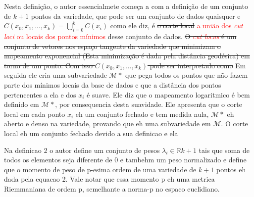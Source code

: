\documentclass[a4paper,titlepage]{article}
\newcommand{\juliana}[1]{\textcolor{red}{#1}}
\begin{document}
\vspace{1em}
\vspace{1em}

Nesta definição, o autor essencialmete começa a com a definição de um conjunto de $k+1$ pontos da variedade, que pode ser um conjunto de dados quaisquer e $C(x_0,x_1,...,x_k) =\bigcup_{i=0}^{k} C(x_i)$ como ele diz, é \sout{o corte local} \juliana{a união dos \textit{cut loci} ou locais dos pontos mínimos} desse conjunto de dados.
\sout{O \juliana{\textit{cut locus}} é um conjunto de vetores nos espaço tangente da variedade que minimizam o mapeamento exponencial (Esta minimização é dada pela distância geodésica) em torno de um ponto. Com isso $C(x_0,x_1,...,x_k)$ pode ser interpretado como}
Em seguida ele cria uma subvariedade $\mathcal{M}{*}$ que pega todos os pontos que não fazem parte dos mínimos locais da base de dados e que a distância dos pontos pertencentes a ela e dos $x_i$ é suave. Ele diz que o mapeamento logaritmico é bem definido em $\mathcal{M}{*}$, por consequencia desta suavidade. Ele apresenta que o corte local em cada ponto $x_i$ eh um conjunto fechado e tem medida nula, $\mathcal{M}{*}$ eh aberto e denso na variedade, provando que eh uma subvariedade em $\mathcal{M}$. O corte local eh um conjunto fechado devido a sua definicao e ela  

\vspace{1em}
\vspace{1em}

Na definicao 2 o autor define um conjunto de pesos $\lambda_i \in \mathbb{R}{k+1}$ tais que soma de todos os elementos seja diferente de 0 e tambehm um peso normalizado e define que o momento de peso de p-esima ordem de uma variedade de $k+1$ pontos eh dada pela equacao 2. Vale notar que essa momento p eh uma metrica Riemmaniana de ordem p, semelhante a norma-p no espaco euclidiano.
\end{document}

